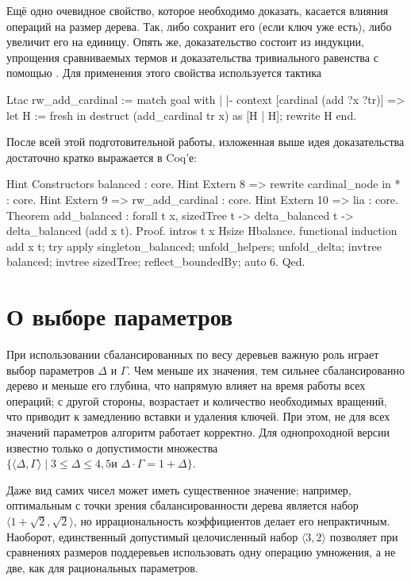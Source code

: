 \documentclass[a4paper,14pt]{extarticle}
\begin{document}
Ещё одно очевидное свойство, которое необходимо доказать,
касается влияния операций на размер дерева.
Так,  либо сохранит его
(если ключ уже есть), либо увеличит его на единицу.
Опять же, доказательство состоит из индукции,
упрощения сравниваемых термов и
доказательства тривиального равенства с помощью .
Для применения этого свойства используется тактика
\begin{coqcode}
Ltac rw_add_cardinal := match goal with
  | |- context [cardinal (add ?x ?tr)] =>
    let H := fresh in
    destruct (add_cardinal tr x) as [H | H];
    rewrite H
end.
\end{coqcode}

После всей этой подготовительной работы,
изложенная выше идея доказательства
достаточно кратко выражается в Coq'е:
\begin{coqcode}
Hint Constructors balanced : core.
Hint Extern 8 => rewrite cardinal_node in * : core.
Hint Extern 9 => rw_add_cardinal : core.
Hint Extern 10 => lia : core.
Theorem add_balanced : forall t x,
  sizedTree t -> delta_balanced t ->
  delta_balanced (add x t).
Proof.
  intros t x Hsize Hbalance.
  functional induction add x t;
  try apply singleton_balanced;
  unfold_helpers; unfold_delta;
  invtree balanced; invtree sizedTree;
  reflect_boundedBy;
  auto 6.
Qed.
\end{coqcode}

\clearpage
\section{О выборе параметров}

При использовании сбалансированных по весу деревьев
важную роль играет выбор параметров \( \Delta \) и \( \Gamma \).
Чем меньше их значения,
тем сильнее сбалансированно дерево
и меньше его глубина,
что напрямую влияет на время работы всех операций;
с другой стороны,
возрастает и количество необходимых вращений,
что приводит к замедлению вставки и удаления ключей.
При этом, не для всех значений параметров
алгоритм работает корректно.
Для однопроходной версии известно только о
допустимости множества
\( \{ \langle \Delta, \Gamma \rangle \mid
\text{$3 \leqslant \Delta \leqslant 4,5$
и $\Delta \cdot \Gamma = 1 + \Delta$} \} \)\cite{lai}. 


Даже вид самих чисел может иметь существенное значение;
например, оптимальным
с точки зрения сбалансированности дерева является
набор \( \langle 1 + \sqrt{2}, \sqrt{2} \rangle \),
но иррациональность коэффициентов
делает его непрактичным\cite{roura}.
Наоборот,
единственный допустимый целочисленный набор \( \langle 3, 2 \rangle \)
позволяет при сравнениях размеров поддеревьев
использовать одну операцию умножения,
а не две, как для рациональных параметров.
\end{document}
